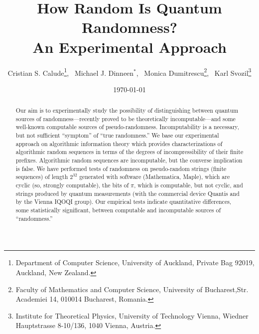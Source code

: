 \documentclass[10pt]{article}%
\begin{document}
\title{How Random Is Quantum Randomness? \\ An Experimental Approach}

\author{Cristian S. Calude\footnote{Department of Computer Science, University of Auckland, Private Bag 92019, Auckland, New Zealand.}, \, Michael J. Dinneen$^{*}$\hspace*{-0.7ex}, \,
Monica Dumitrescu\footnote{Faculty of Mathematics and Computer Science, University of Bucharest,Str. Academiei 14, 010014 Bucharest, Romania.}, \, Karl Svozil\footnote{Institute for Theoretical Physics, University of Technology Vienna,
Wiedner Hauptstrasse 8-10/136, 1040 Vienna,  Austria.}}







\date{\today}
\maketitle

\begin{abstract}Our aim is to experimentally study the possibility of distinguishing between
quantum sources of randomness---recently proved to be theoretically incomputable---and  some well-known computable
sources of  pseudo-randomness. Incomputability is a necessary, but not sufficient ``symptom''
of ``true randomness.'' We base our experimental approach on algorithmic information theory
which provides characterizations of algorithmic random sequences in terms of the degrees of incompressibility of their finite prefixes. Algorithmic random sequences are incomputable, but the converse implication is false.
We have performed tests of randomness on pseudo-random strings (finite sequences) of length $2^{32}$ generated with software
(Mathematica, Maple), which are cyclic (so, strongly computable), the bits of $\pi$, which is computable, but not cyclic, and strings produced by quantum measurements  (with the commercial device Quantis and  by the Vienna IQOQI group).
Our empirical tests indicate quantitative differences, some statistically significant,  between computable
and incomputable sources of ``randomness.''
\end{abstract}
\end{document}
